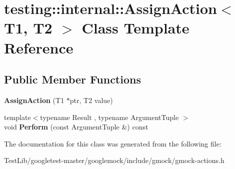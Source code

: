 \hypertarget{classtesting_1_1internal_1_1AssignAction}{}\section{testing\+:\+:internal\+:\+:Assign\+Action$<$ T1, T2 $>$ Class Template Reference}
\label{classtesting_1_1internal_1_1AssignAction}
\subsection*{Public Member Functions}
\begin{DoxyCompactItemize}
\item 
\mbox{\label{classtesting_1_1internal_1_1AssignAction_ae5a8fe8954ff3f8b26a08b57c3afdf9a}} 
{\bfseries Assign\+Action} (T1 $\ast$ptr, T2 value)
\item 
\mbox{\label{classtesting_1_1internal_1_1AssignAction_a540912bec1f4de6fc4c7de26312e4586}} 
{\footnotesize template$<$typename Result , typename Argument\+Tuple $>$ }\\void {\bfseries Perform} (const Argument\+Tuple \&) const
\end{DoxyCompactItemize}


The documentation for this class was generated from the following file\+:\begin{DoxyCompactItemize}
\item 
Test\+Lib/googletest-\/master/googlemock/include/gmock/gmock-\/actions.\+h\end{DoxyCompactItemize}
